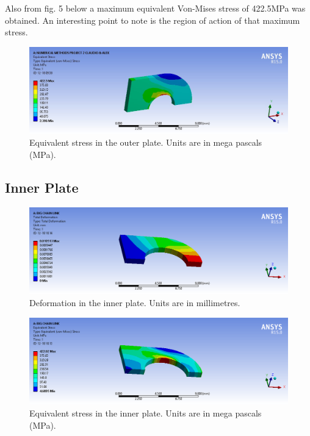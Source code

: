 \documentclass[a4paper 12pt]{article}
\begin{document}
Also from fig. 5 below a maximum equivalent Von-Mises stress of 422.5MPa was obtained. An interesting point to note is the region of action of that maximum stress. 

\begin{figure}[!ht]
    \centering
    \includegraphics[width=1\textwidth]{images/CHAIN_SMALL_STRESS_TEST_FINAL.jpg}
    \caption{Equivalent stress in the outer plate. Units are in mega pascals (MPa).}
    \label{fig:outer_stress}
\end{figure}

\newpage
\subsection{Inner Plate}

\begin{figure}[!ht]
    \centering
    \includegraphics[width=1\textwidth]{images/INNER_CHAIN_DEFORMATION.png}
    \caption{Deformation in the inner plate. Units are in millimetres.}
    \label{fig:inner_deformation}
\end{figure}

\begin{figure}[!ht]
    \centering
    \includegraphics[width=1\textwidth]{images/INNER_CHAIN_STRESS.png}
    \caption{Equivalent stress in the inner plate. Units are in mega pascals (MPa).}
    \label{fig:inner_stress}
\end{figure}
\end{document}
